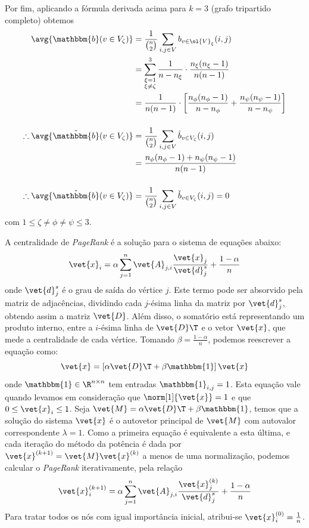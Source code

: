 \documentclass[l15, tikzdraw]{homework}
\begin{document}
	Por fim, aplicando a fórmula derivada acima para $k = 3$ (grafo tripartido completo) obtemos%
	\begin{align*}%
		\avg{\mathbbm{b}(v \in V_\zeta)} &= \frac{1}{\binom{n}{2}} \sum_{i, j \in V} b_{v \in \ol{V}_\xi}(i, j)\\%
		&= \sum_{\substack{\xi = 1 \\ \xi \neq \zeta}}^{3} \frac{ 1 }{ n - n_\xi } \cdot \frac{ n_\xi (n_\xi - 1) }{ n (n - 1) }\\%
		&= \frac{ 1 }{ n (n - 1) } \cdot \left[%
			\frac{ n_\phi (n_\phi - 1) }{ n - n_\phi } +
			\frac{ n_\psi (n_\psi - 1) }{ n - n_\psi }
		\right]\\[3ex]%
\therefore%
		\avg{\hat{\mathbbm{b}}(v \in V_\zeta)} &= \frac{1}{\binom{n}{2}} \sum_{i, j \in V} \hat{b}_{v \in V_\zeta}(i, j)\\ &= \frac{ { n_\phi (n_\phi - 1) } +
		{ n_\psi (n_\psi - 1) } }{ n (n - 1) }\\[3ex]%
\therefore%
		\avg{\check{\mathbbm{b}}(v \in V_\zeta)} &= \frac{1}{\binom{n}{2}} \sum_{i, j \in V} \check{b}_{v \in V_\zeta}(i, j) = 0
	\end{align*}%
	com $1 \le \zeta \neq \phi \neq \psi \le 3$.
	

	\subquest{}%
	A centralidade de \textit{PageRank} é a solução para o sistema de equações abaixo:
		$$\vet{x}_i = \alpha \sum_{j = 1}^n \vet{A}_{j, i} \frac{\vet{x}_j}{\vet{d}^s_j} + \frac{1 - \alpha}{n}$$
	onde $\vet{d}^s_j$ é o grau de saída do vértice $j$. Este termo pode ser absorvido pela matriz de adjacências, dividindo cada $j$-ésima linha da matriz por $\vet{d}^s_j$, obtendo assim a matriz $\vet{D}$. Além disso, o somatório está representando um produto interno, entre a $i$-ésima linha de $\vet{D}\T$ e o vetor $\vet{x}$, que mede a centralidade de cada vértice. Tomando $\beta = \frac{1 - \alpha}{n}$, podemos reescrever a equação como:
		$$\vet{x} = \left[\alpha \vet{D}\T + \beta \mathbbm{1} \right] \vet{x}$$
	onde $\mathbbm{1} \in \R^{n \times n}$ tem entradas $\mathbbm{1}_{i,j} = 1$. Esta equação vale quando levamos em consideração que $\norm[1]{\vet{x}} = 1$ e que $0 \le \vet{x}_i \le 1$. Seja $\vet{M} = \alpha \vet{D}\T + \beta \mathbbm{1}$, temos que a solução do sistema $\vet{x}$ é o autovetor principal de $\vet{M}$ com autovalor correspondente $\lambda = 1$. Como a primeira equação é equivalente a esta última, e cada iteração do método da potência é dada por $\vet{x}^{(k + 1)} = \vet{M} \vet{x}^{(k)}$ a menos de uma normalização, podemos calcular o \textit{PageRank} iterativamente, pela relação
	$$\vet{x}^{(k + 1)}_i = \alpha \sum_{j = 1}^n \vet{A}_{j, i} \frac{\vet{x}^{(k)}_j}{\vet{d}^s_j} + \frac{1 - \alpha}{n}$$
	Para tratar todos os nós com igual importância inicial, atribui-se $\vet{x}_i^{(0)} = \frac{1}{n}$.
\end{document}

